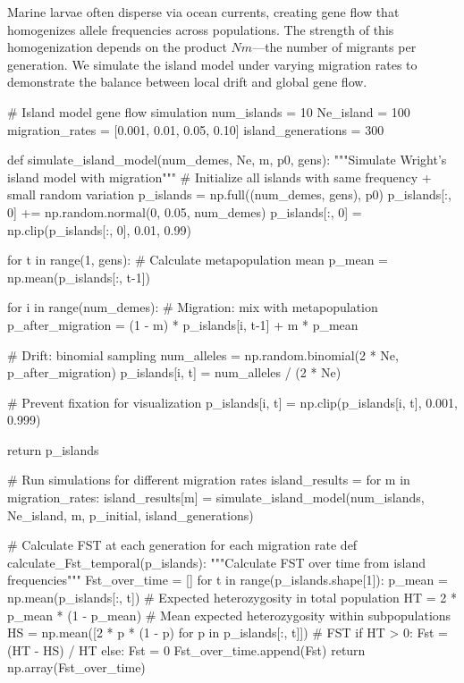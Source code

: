 \documentclass[11pt,a4paper]{article}
\begin{document}
Marine larvae often disperse via ocean currents, creating gene flow that homogenizes allele frequencies
across populations. The strength of this homogenization depends on the product $Nm$—the number of
migrants per generation. We simulate the island model under varying migration rates to demonstrate
the balance between local drift and global gene flow.

\begin{pycode}
# Island model gene flow simulation
num_islands = 10
Ne_island = 100
migration_rates = [0.001, 0.01, 0.05, 0.10]
island_generations = 300

def simulate_island_model(num_demes, Ne, m, p0, gens):
    """Simulate Wright's island model with migration"""
    # Initialize all islands with same frequency + small random variation
    p_islands = np.full((num_demes, gens), p0)
    p_islands[:, 0] += np.random.normal(0, 0.05, num_demes)
    p_islands[:, 0] = np.clip(p_islands[:, 0], 0.01, 0.99)

    for t in range(1, gens):
        # Calculate metapopulation mean
        p_mean = np.mean(p_islands[:, t-1])

        for i in range(num_demes):
            # Migration: mix with metapopulation
            p_after_migration = (1 - m) * p_islands[i, t-1] + m * p_mean

            # Drift: binomial sampling
            num_alleles = np.random.binomial(2 * Ne, p_after_migration)
            p_islands[i, t] = num_alleles / (2 * Ne)

            # Prevent fixation for visualization
            p_islands[i, t] = np.clip(p_islands[i, t], 0.001, 0.999)

    return p_islands

# Run simulations for different migration rates
island_results = {}
for m in migration_rates:
    island_results[m] = simulate_island_model(num_islands, Ne_island, m, p_initial, island_generations)

# Calculate FST at each generation for each migration rate
def calculate_Fst_temporal(p_islands):
    """Calculate FST over time from island frequencies"""
    Fst_over_time = []
    for t in range(p_islands.shape[1]):
        p_mean = np.mean(p_islands[:, t])
        # Expected heterozygosity in total population
        HT = 2 * p_mean * (1 - p_mean)
        # Mean expected heterozygosity within subpopulations
        HS = np.mean([2 * p * (1 - p) for p in p_islands[:, t]])
        # FST
        if HT > 0:
            Fst = (HT - HS) / HT
        else:
            Fst = 0
        Fst_over_time.append(Fst)
    return np.array(Fst_over_time)


\end{pycode}
\end{document}

